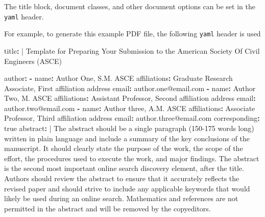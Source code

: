 \documentclass[NewProceedings, InsideFigs,LineNumbers]{asce-quarto}
\newenvironment{Shaded}{\begin{snugshade}}{\end{snugshade}}
\newcommand{\AttributeTok}[1]{\textcolor[rgb]{0.40,0.45,0.13}{#1}}
\newcommand{\CharTok}[1]{\textcolor[rgb]{0.13,0.47,0.30}{#1}}
\newcommand{\FunctionTok}[1]{\textcolor[rgb]{0.28,0.35,0.67}{#1}}
\newcommand{\KeywordTok}[1]{\textcolor[rgb]{0.00,0.23,0.31}{\textbf{#1}}}
\newcommand{\NormalTok}[1]{\textcolor[rgb]{0.00,0.23,0.31}{#1}}
\begin{document}
The title block, document classes, and other document options can be set
in the \texttt{yaml} header.

For example, to generate this example PDF file, the following
\texttt{yaml} header is used

\begin{Shaded}
\begin{Highlighting}[]
\FunctionTok{title}\KeywordTok{: }\CharTok{|}\AttributeTok{ }
\NormalTok{  Template for Preparing Your Submission to the }
\NormalTok{  American Society Of Civil Engineers (ASCE) }

\FunctionTok{author}\KeywordTok{:}
\AttributeTok{  }\KeywordTok{{-}}\AttributeTok{ }\FunctionTok{name}\KeywordTok{:}\AttributeTok{ Author One, S.M. ASCE}
\AttributeTok{    }\FunctionTok{affiliations}\KeywordTok{:}\AttributeTok{ Graduate Research Associate, First affiliation address}
\AttributeTok{    }\FunctionTok{email}\KeywordTok{:}\AttributeTok{ author.one@email.com}
\AttributeTok{  }\KeywordTok{{-}}\AttributeTok{ }\FunctionTok{name}\KeywordTok{:}\AttributeTok{ Author Two, M. ASCE}
\AttributeTok{    }\FunctionTok{affiliations}\KeywordTok{:}\AttributeTok{ Assistant Professor, Second affiliation address}
\AttributeTok{    }\FunctionTok{email}\KeywordTok{:}\AttributeTok{ author.two@email.com}
\AttributeTok{  }\KeywordTok{{-}}\AttributeTok{ }\FunctionTok{name}\KeywordTok{:}\AttributeTok{ Author three, A.M. ASCE}
\AttributeTok{    }\FunctionTok{affiliations}\KeywordTok{:}\AttributeTok{ Associate Professor, Third affiliation address}
\AttributeTok{    }\FunctionTok{email}\KeywordTok{:}\AttributeTok{ author.three@email.com}
\AttributeTok{    }\FunctionTok{corresponding}\KeywordTok{:}\AttributeTok{ }\CharTok{true}
\FunctionTok{abstract}\KeywordTok{: }\CharTok{|}
\NormalTok{  The abstract should be a single paragraph (150{-}175 words long) written}
\NormalTok{  in plain language and include a summary of the key conclusions of the}
\NormalTok{  manuscript. It should clearly state the purpose of the work, the scope}
\NormalTok{  of the effort, the procedures used to execute the work, and major}
\NormalTok{  findings. The abstract is the second most important online search}
\NormalTok{  discovery element, after the title. Authors should review the abstract}
\NormalTok{  to ensure that it accurately reflects the revised paper and should}
\NormalTok{  strive to include any applicable keywords that would likely be used}
\NormalTok{  during an online search. Mathematics and references are not permitted}
\NormalTok{  in the abstract and will be removed by the copyeditors.}

\end{Highlighting}
\end{Shaded}
\end{document}
